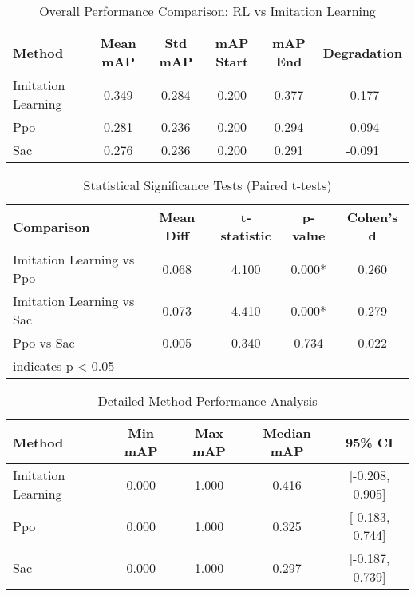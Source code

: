 
\begin{table}[htbp]
\centering
\caption{Overall Performance Comparison: RL vs Imitation Learning}
\label{tab:overall_performance}
\begin{tabular}{lccccc}
\toprule
Method & Mean mAP & Std mAP & mAP Start & mAP End & Degradation \\
\midrule

Imitation Learning & 0.349 & 0.284 & 0.200 & 0.377 & -0.177 \\
Ppo & 0.281 & 0.236 & 0.200 & 0.294 & -0.094 \\
Sac & 0.276 & 0.236 & 0.200 & 0.291 & -0.091 \\

\bottomrule
\end{tabular}
\end{table}


\begin{table}[htbp]
\centering
\caption{Statistical Significance Tests (Paired t-tests)}
\label{tab:statistical_tests}
\begin{tabular}{lcccc}
\toprule
Comparison & Mean Diff & t-statistic & p-value & Cohen's d \\
\midrule

Imitation Learning vs Ppo & 0.068 & 4.100 & 0.000* & 0.260 \\
Imitation Learning vs Sac & 0.073 & 4.410 & 0.000* & 0.279 \\
Ppo vs Sac & 0.005 & 0.340 & 0.734 & 0.022 \\

\bottomrule
\multicolumn{5}{l}{\footnotesize * indicates p < 0.05} \\
\end{tabular}
\end{table}


\begin{table}[htbp]
\centering
\caption{Detailed Method Performance Analysis}
\label{tab:detailed_performance}
\begin{tabular}{lcccc}
\toprule
Method & Min mAP & Max mAP & Median mAP & 95\% CI \\
\midrule

Imitation Learning & 0.000 & 1.000 & 0.416 & [-0.208, 0.905] \\
Ppo & 0.000 & 1.000 & 0.325 & [-0.183, 0.744] \\
Sac & 0.000 & 1.000 & 0.297 & [-0.187, 0.739] \\

\bottomrule
\end{tabular}
\end{table}
